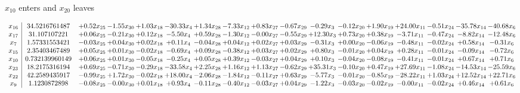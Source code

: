 \documentclass[9pt]{article}
\begin{document}
 $ x_{10} $ enters and $ x_{20} $ leaves 

 \[\begin{array}{c| c c@{\hskip 2pt} c@{\hskip 2pt} c@{\hskip 2pt} c@{\hskip 2pt} c@{\hskip 2pt} c@{\hskip 2pt} c@{\hskip 2pt} c@{\hskip 2pt} c@{\hskip 2pt} c@{\hskip 2pt} c@{\hskip 2pt} c@{\hskip 2pt} c@{\hskip 2pt} c@{\hskip 2pt} c@{\hskip 2pt} }
 x_{16}   &  34.5216761487 & +  0.52 x_{25} & -1.55 x_{30} & +  1.03 x_{18} & -30.33 x_{4} & +  1.34 x_{28} & -7.33 x_{12} & +  0.83 x_{27} & -0.67 x_{29} & -0.29 x_{3} & -0.12 x_{20} & +  1.90 x_{19} & + 24.00 x_{11} & -0.51 x_{24} & -35.78 x_{14} & -40.68 x_{6}\\
 x_{17}   &  31.107107221 & +  0.06 x_{25} & -0.21 x_{30} & +  0.12 x_{18} & -5.50 x_{4} & +  0.59 x_{28} & -1.30 x_{12} & -0.00 x_{27} & -0.55 x_{29} & + 12.30 x_{3} & +  0.73 x_{20} & +  0.38 x_{19} & -3.71 x_{11} & -0.47 x_{24} & -8.82 x_{14} & -12.48 x_{6}\\
 x_{7}   &  1.57331553421 & -0.03 x_{25} & +  0.04 x_{30} & +  0.02 x_{18} & +  0.11 x_{4} & -0.04 x_{28} & +  0.04 x_{12} & +  0.02 x_{27} & +  0.03 x_{29} & -0.31 x_{3} & +  0.00 x_{20} & -0.06 x_{19} & -0.48 x_{11} & -0.02 x_{24} & +  0.58 x_{14} & -0.31 x_{6}\\
 x_{15}   &  2.35403467489 & +  0.05 x_{25} & +  0.01 x_{30} & -0.02 x_{18} & -0.69 x_{4} & +  0.09 x_{28} & -0.38 x_{12} & +  0.03 x_{27} & +  0.02 x_{29} & +  0.80 x_{3} & -0.01 x_{20} & +  0.04 x_{19} & +  0.28 x_{11} & -0.01 x_{24} & -0.09 x_{14} & -0.72 x_{6}\\
 x_{10}   &  0.732139960149 & +  0.06 x_{25} & +  0.01 x_{30} & -0.05 x_{18} & -0.25 x_{4} & +  0.05 x_{28} & +  0.39 x_{12} & -0.03 x_{27} & +  0.04 x_{29} & +  0.10 x_{3} & -0.04 x_{20} & -0.08 x_{19} & -0.41 x_{11} & -0.01 x_{24} & +  0.67 x_{14} & +  0.71 x_{6}\\
 x_{23}   &  18.2175316194 & +  0.69 x_{25} & -0.71 x_{30} & -0.29 x_{18} & -33.58 x_{4} & +  2.25 x_{28} & +  1.16 x_{12} & +  1.13 x_{27} & -0.62 x_{29} & + 35.31 x_{3} & -0.10 x_{20} & +  0.47 x_{19} & + 27.69 x_{11} & -1.08 x_{24} & -14.53 x_{14} & -25.59 x_{6}\\
 x_{22}   &  42.2589435917 & -0.99 x_{25} & +  1.72 x_{30} & -0.02 x_{18} & + 18.00 x_{4} & -2.06 x_{28} & -1.84 x_{12} & -0.11 x_{27} & +  0.63 x_{29} & -5.77 x_{3} & -0.01 x_{20} & -0.85 x_{19} & -28.22 x_{11} & +  1.03 x_{24} & + 12.52 x_{14} & + 22.71 x_{6}\\
 x_{9}   &  1.1230872898 & -0.08 x_{25} & -0.00 x_{30} & +  0.01 x_{18} & +  0.93 x_{4} & -0.11 x_{28} & -0.40 x_{12} & -0.03 x_{27} & +  0.04 x_{29} & -1.22 x_{3} & -0.03 x_{20} & -0.02 x_{19} & -0.00 x_{11} & -0.02 x_{24} & +  0.46 x_{14} & +  0.61 x_{6}\\

\end{array}\]
\end{document}
